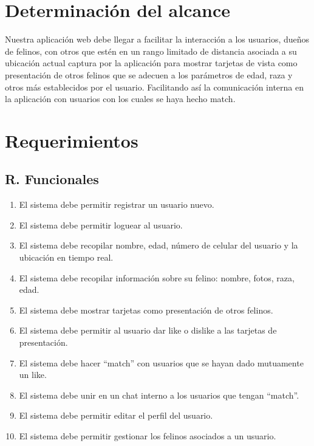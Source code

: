 \documentclass{article}
\begin{document}
\onehalfspacing    


\clearpage
\tableofcontents
\clearpage 
\section{Determinación del alcance}
Nuestra aplicación web debe llegar a facilitar la interacción a los usuarios, dueños de felinos, con otros que estén en un rango limitado de distancia asociada a su ubicación actual captura por la aplicación para mostrar tarjetas de vista como presentación de otros felinos que se adecuen a los parámetros de edad, raza y otros más establecidos por el usuario. Facilitando así la comunicación interna en la aplicación con usuarios con los cuales se haya hecho match.
\section{Requerimientos}
\subsection{R. Funcionales}
\begin{enumerate}
    \item El sistema debe permitir registrar un usuario nuevo.
    \item El sistema debe permitir loguear al usuario.
    \item El sistema debe recopilar nombre, edad, número de celular del usuario y la ubicación en tiempo real.
    \item El sistema debe recopilar información sobre su felino: nombre, fotos, raza, edad.
    \item El sistema debe mostrar tarjetas como presentación de otros felinos.
    \item El sistema debe permitir al usuario dar like o dislike a las tarjetas de presentación.
    \item El sistema debe hacer “match” con usuarios que se hayan dado mutuamente un like.
    \item El sistema debe unir en un chat interno a los usuarios que tengan “match”.
    \item El sistema debe permitir editar el perfil del usuario.
    \item El sistema debe permitir gestionar los felinos asociados a un usuario.
\end{enumerate}
\end{document}
